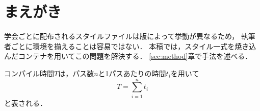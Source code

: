\section{まえがき}
\label{sec:intro}

学会ごとに配布されるスタイルファイルは版によって挙動が異なるため，
執筆者ごとに環境を揃えることは容易ではない\cite{knuth1984}．
本稿では，スタイル一式を焼き込んだコンテナを用いてこの問題を解決する\cite{denshi2024}．
\ref{sec:method}章で手法を述べる．

コンパイル時間$T$は，パス数$n$と1パスあたりの時間$t_i$を用いて
\begin{equation}
  T = \sum_{i=1}^{n} t_i
  \label{eq:time}
\end{equation}
と表される．
